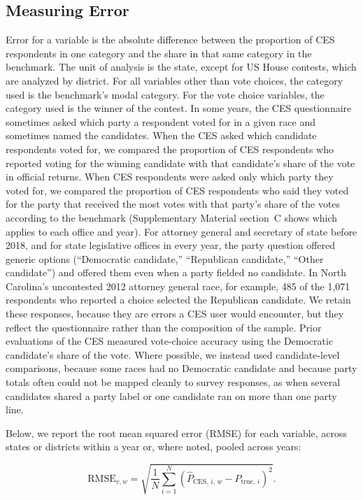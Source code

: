 \documentclass[12pt]{article}
\begin{document}
\subsection*{Measuring Error}
Error for a variable is the absolute difference between the proportion of CES respondents in one category and the share in that same category in the benchmark. The unit of analysis is the state, except for US House contests, which are analyzed by district. For all variables other than vote choices, the category used is the benchmark's modal category. For the vote choice variables, the category used is the winner of the contest. In some years, the CES questionnaire sometimes asked which party a respondent voted for in a given race and sometimes named the candidates. When the CES asked which candidate respondents voted for, we compared the proportion of CES respondents who reported voting for the winning candidate with that candidate's share of the vote in official returns. When CES respondents were asked only which party they voted for, we compared the proportion of CES respondents who said they voted for the party that received the most votes with that party's share of the votes according to the benchmark (Supplementary Material section~C shows which applies to each office and year). For attorney general and secretary of state before 2018, and for state legislative offices in every year, the party question offered generic options (``Democratic candidate,'' ``Republican candidate,'' ``Other candidate'') and offered them even when a party fielded no candidate. In North Carolina's uncontested 2012 attorney general race, for example, 485 of the 1,071 respondents who reported a choice selected the Republican candidate. We retain these responses, because they are errors a CES user would encounter, but they reflect the questionnaire rather than the composition of the sample. Prior evaluations of the CES measured vote-choice accuracy using the Democratic candidate's share of the vote. Where possible, we instead used candidate-level comparisons, because some races had no Democratic candidate and because party totals often could not be mapped cleanly to survey responses, as when several candidates shared a party label or one candidate ran on more than one party line.

Below, we report the root mean squared error (RMSE) for each variable, across states or districts within a year or, where noted, pooled across years:

\[
\text{RMSE}_{v,w} = 
\sqrt{\frac{1}{N} \sum_{i=1}^{N} 
\left( \widehat{P}_{\text{CES},\, i,\, w} - P_{\text{true},\, i} \right)^{2}}.
\]
 
\end{document}
